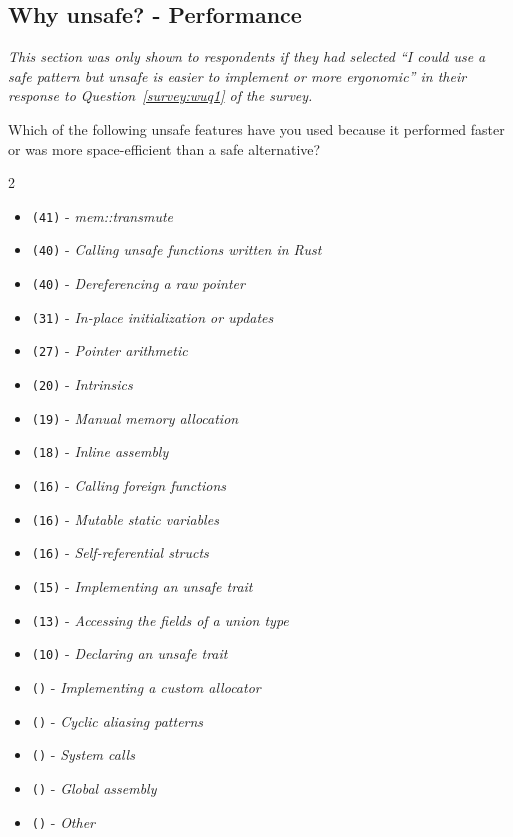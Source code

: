 \subsection{Why unsafe? - Performance}
\label{survey:sec:wupq}
\textit{This section was only shown to respondents if they had selected ``\textit{I could use a safe pattern but unsafe is easier to implement or more ergonomic}'' in their response to Question~\ref{survey:wuq1} of the survey.}
\begin{protocol}
\item \label{survey:wupq1}  Which of the following unsafe features have you used because it performed faster or was more space-efficient than a safe alternative?
\begin{multicols}{2}
\begin{itemize}
\item \texttt{(41)} - \textit{mem::transmute}
\item \texttt{(40)} - \textit{Calling unsafe functions written in Rust}
\item \texttt{(40)} - \textit{Dereferencing a raw pointer}
\item \texttt{(31)} - \textit{In-place initialization or updates}
\item \texttt{(27)} - \textit{Pointer arithmetic}
\item \texttt{(20)} - \textit{Intrinsics}
\item \texttt{(19)} - \textit{Manual memory allocation}
\item \texttt{(18)} - \textit{Inline assembly}
\item \texttt{(16)} - \textit{Calling foreign functions}
\item \texttt{(16)} - \textit{Mutable static variables}
\item \texttt{(16)} - \textit{Self-referential structs}
\item \texttt{(15)} - \textit{Implementing an unsafe trait}
\item \texttt{(13)} - \textit{Accessing the fields of a union type}
\item \texttt{(10)} - \textit{Declaring an unsafe trait}
\item \texttt{()} - \textit{Implementing a custom allocator}
\item \texttt{()} - \textit{Cyclic aliasing patterns}
\item \texttt{()} - \textit{System calls}
\item \texttt{()} - \textit{Global assembly}
\item \texttt{()} - \textit{Other}
\end{itemize}
\end{multicols}
\end{protocol}

